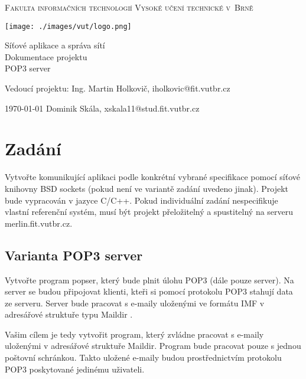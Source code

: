 \documentclass[11pt,a4paper]{report}
\makeatletter
\def\myauthor{Dominik Skála, xskala11@stud.fit.vutbr.cz}
\def\myleader{Vedoucí projektu:}
\def\myleadername{Ing. Martin Holkovič, iholkovic@fit.vutbr.cz}
\def\mytitle{Síťové aplikace a správa sítí \\ Dokumentace projektu}
\makeatother
\begin{document}
    \thispagestyle{empty}
    \begin{center}
        \Huge
        \textsc{Fakulta informačních technologií Vysoké učení technické v~Brně}

        \begin{center}
            \texttt{[image: ./images/vut/logo.png]}
        \end{center}
        \mytitle
        \\
        \LARGE POP3 server
    \end{center}

    {\Large
    \begin{flushleft}
        \myleader \hfill
        \myleadername
    \end{flushleft}
    \begin{flushright}
        \today \hfill
        \myauthor
    \end{flushright}}

    \clearpage

    \tableofcontents %

    \clearpage
    \section{Zadání}
    Vytvořte komunikující aplikaci podle konkrétní vybrané specifikace pomocí síťové knihovny BSD sockets (pokud není ve variantě zadání uvedeno jinak). Projekt bude vypracován v jazyce C/C++. Pokud individuální zadání nespecifikuje vlastní referenční systém, musí být projekt přeložitelný a spustitelný na serveru merlin.fit.vutbr.cz.
    \subsection{Varianta POP3 server}
    Vytvořte program popser, který bude plnit úlohu POP3 \cite{P3Server} (dále pouze server). Na server se budou připojovat klienti, kteři si pomocí protokolu POP3 stahují data ze serveru. Server bude pracovat s e-maily uloženými ve formátu IMF \cite{IMF} v adresářové struktuře typu Maildir \cite{MAILDIR}.

    Vašim cílem je tedy vytvořit program, který zvládne pracovat s e-maily uloženými v adresářové struktuře Maildir. Program bude pracovat pouze s jednou poštovní schránkou. Takto uložené e-maily budou prostřednictvím protokolu POP3 poskytované jedinému uživateli.
\end{document}
